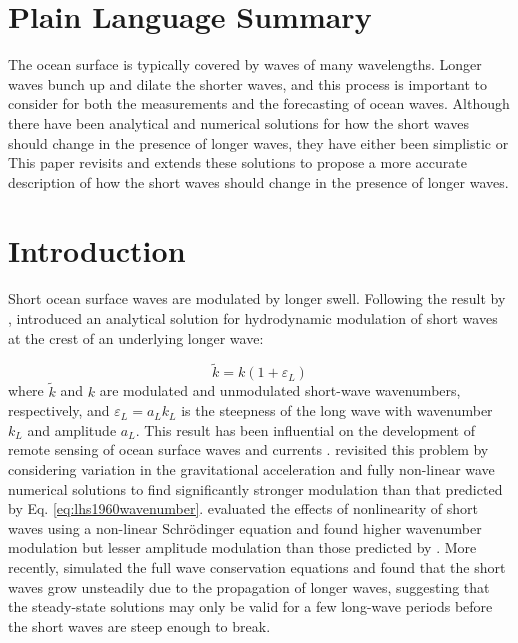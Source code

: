 \documentclass[draft]{agujournal2019}
\begin{document}
\section*{Plain Language Summary}
The ocean surface is typically covered by waves of many wavelengths.
Longer waves bunch up and dilate the shorter waves, and this process is
important to consider for both the measurements and the forecasting of ocean
waves.
Although there have been analytical and numerical solutions for how the short
waves should change in the presence of longer waves, they have either been
simplistic or 
This paper revisits and extends these solutions to propose a more accurate
description of how the short waves should change in the presence of longer
waves.

\section{Introduction}

Short ocean surface waves are modulated by longer swell.
Following the result by ,
 introduced an analytical solution for hydrodynamic
modulation of short waves at the crest of an underlying longer wave:

\begin{equation}
\label{eq:lhs1960wavenumber}
\widetilde{k} = k (1 + \varepsilon_L)
\end{equation}
where $\widetilde{k}$ and $k$ are modulated and unmodulated short-wave wavenumbers,
respectively, and $\varepsilon_L = a_L k_L$ is the steepness of the long wave with
wavenumber $k_L$ and amplitude $a_L$.
This result has been influential on the development of remote sensing of ocean
surface waves and currents \cite{keller1975microwave,hara1994hydrodynamic}.
 revisited this problem by considering variation
in the gravitational acceleration and fully non-linear wave numerical solutions
to find significantly stronger modulation than that predicted by
Eq. \ref{eq:lhs1960wavenumber}.
 evaluated the effects of nonlinearity of short waves
using a non-linear Schr\" odinger equation and found higher wavenumber
modulation but lesser amplitude modulation than those predicted by
.
More recently, \cite{peureux2021unsteady} simulated the full wave conservation
equations and found that the short waves grow unsteadily due to the propagation of
longer waves, suggesting that the steady-state solutions may only be valid for
a few long-wave periods before the short waves are steep enough to break. 
\end{document}
